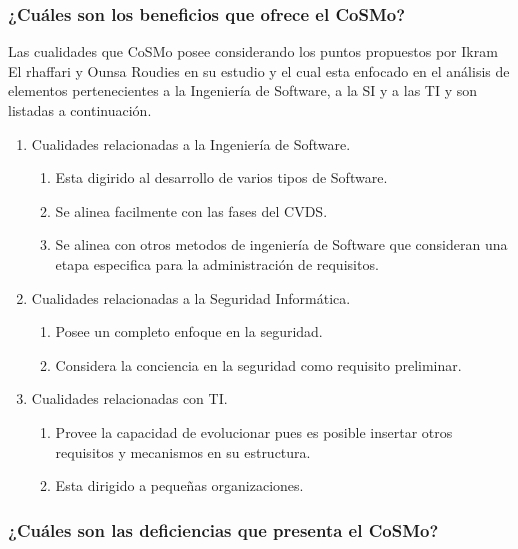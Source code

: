 \documentclass[runningheads,a4paper]{llncs}
\begin{document}
\subsubsection{¿Cuáles son los beneficios que ofrece el \gls{CoSMo}?}
Las cualidades que \gls{CoSMo} posee considerando los puntos propuestos por Ikram El rhaffari y Ounsa Roudies en su estudio y el cual esta enfocado en el análisis de elementos pertenecientes a la Ingeniería de \gls{Software}, a la \gls{SI} y a las \gls{TI} y son listadas a continuación.  

\begin{enumerate}
	\item Cualidades relacionadas a la Ingeniería de \gls{Software}.
		\begin{enumerate}
			\item Esta digirido al desarrollo de varios tipos de \gls{Software}.
			\item Se alinea facilmente con las fases del \gls{CVDS}.
			\item Se alinea con otros metodos de ingeniería de \gls{Software} que consideran una etapa especifica para la administración de requisitos.\\
			
		\end{enumerate}
	\item Cualidades relacionadas a la Seguridad Informática.
		\begin{enumerate}
			\item Posee un completo enfoque en la seguridad.
			\item Considera la conciencia en la seguridad como requisito preliminar.\\

		\end{enumerate}
	\item Cualidades relacionadas con \gls{TI}.
		\begin{enumerate} 
			\item Provee la capacidad de evolucionar pues es posible insertar otros requisitos y mecanismos en su estructura.
			\item Esta dirigido a pequeñas organizaciones.\\
		\end{enumerate}
\end{enumerate}

\subsubsection{¿Cuáles son las deficiencias que presenta el \gls{CoSMo}?}
\end{document}
